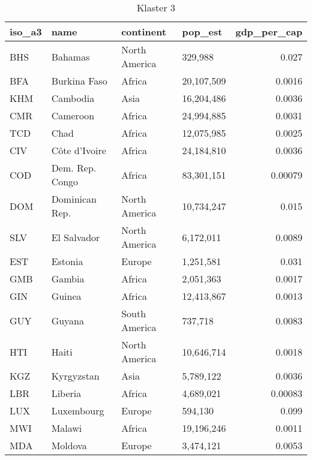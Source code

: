 \begin{table}
    \centering
    \caption{Klaster 3}
    \label{tab:cl3}
    \begin{tabular}{llllr}
        \toprule
        iso\_a3 & name            & continent     & pop\_est   & gdp\_per\_cap \\
        \midrule
        BHS     & Bahamas         & North America & 329,988    & 0.027         \\
        BFA     & Burkina Faso    & Africa        & 20,107,509 & 0.0016        \\
        KHM     & Cambodia        & Asia          & 16,204,486 & 0.0036        \\
        CMR     & Cameroon        & Africa        & 24,994,885 & 0.0031        \\
        TCD     & Chad            & Africa        & 12,075,985 & 0.0025        \\
        CIV     & Côte d'Ivoire   & Africa        & 24,184,810 & 0.0036        \\
        COD     & Dem. Rep. Congo & Africa        & 83,301,151 & 0.00079       \\
        DOM     & Dominican Rep.  & North America & 10,734,247 & 0.015         \\
        SLV     & El Salvador     & North America & 6,172,011  & 0.0089        \\
        EST     & Estonia         & Europe        & 1,251,581  & 0.031         \\
        GMB     & Gambia          & Africa        & 2,051,363  & 0.0017        \\
        GIN     & Guinea          & Africa        & 12,413,867 & 0.0013        \\
        GUY     & Guyana          & South America & 737,718    & 0.0083        \\
        HTI     & Haiti           & North America & 10,646,714 & 0.0018        \\
        KGZ     & Kyrgyzstan      & Asia          & 5,789,122  & 0.0036        \\
        LBR     & Liberia         & Africa        & 4,689,021  & 0.00083       \\
        LUX     & Luxembourg      & Europe        & 594,130    & 0.099         \\
        MWI     & Malawi          & Africa        & 19,196,246 & 0.0011        \\
        MDA     & Moldova         & Europe        & 3,474,121  & 0.0053        \\

\end{tabular}
\end{table}

